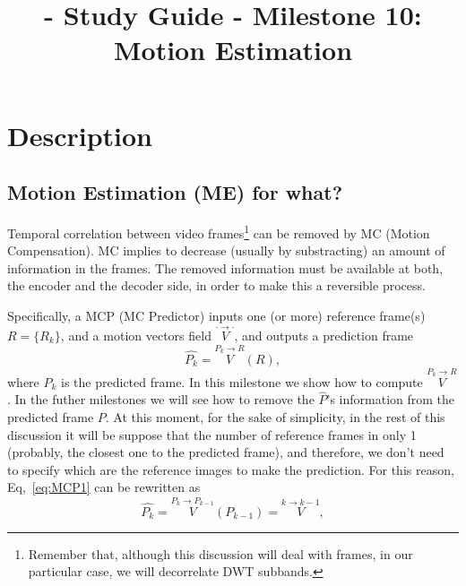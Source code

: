 
\title{\SM{} - Study Guide - Milestone 10: Motion Estimation}

\maketitle

\tableofcontents

\section{Description}

\subsection{Motion Estimation (ME) for what?}
Temporal correlation between video frames\footnote{Remember that,
  although this discussion will deal with frames, in our particular
  case, we will decorrelate DWT subbands.} can be removed by MC
(Motion Compensation). MC implies to decrease (usually by
substracting) an amount of information in the frames. The removed
information must be available at both, the encoder and the decoder
side, in order to make this a reversible process.

Specifically, a MCP (MC Predictor) inputs one (or more) reference
frame(s) $R=\{R_k\}$, and a motion vectors field
$\overset{\cdot\rightarrow\cdot}{V}$, and outputs a prediction frame
\begin{equation}
  \hat{P_k} =  \overset{P_k\rightarrow R}{V}(R),
  \label{eq:MCP1}
\end{equation}
where $P_k$ is the predicted frame. In this milestone we show how to
compute $\overset{P_k\rightarrow R}{V}$. In the futher milestones we
will see how to remove the $\hat{P}$'s information from the predicted
frame $P$. At this moment, for the sake of simplicity, in the rest of
this discussion it will be suppose that the number of reference frames
in only 1 (probably, the closest one to the predicted frame), and
therefore, we don't need to specify which are the reference images to
make the prediction. For this reason, Eq,~\ref{eq:MCP1} can be
rewritten as
\begin{equation}
  \hat{P_k} =  \overset{P_k\rightarrow P_{k-1}}{V}(P_{k-1}) = \overset{k\rightarrow k-1}{V},
  \label{eq:MCP2}
\end{equation}

